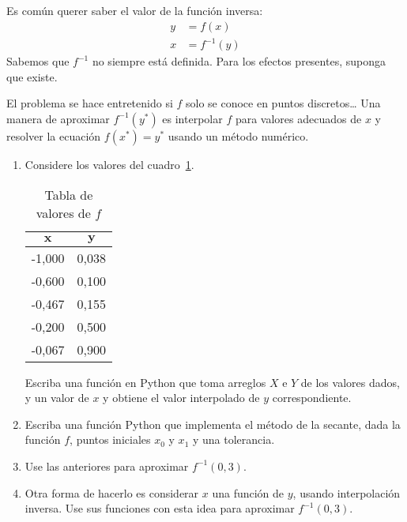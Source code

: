 \documentclass[spanish, fleqn]{article}
\title{Tarea \num\\
       \large Algoritmos y Complejidad\\[3ex]
       \emph{``Tonteando\ldots''}}
\author{Algorithm Knaves}
\date{2018-03-26}
\begin{document}
\maketitle

  Es común querer saber el valor de la función inversa:
  \begin{align*}
    y
      &= f(x) \\
    x
      &= f^{-1}(y)
  \end{align*}
  Sabemos que \(f^{-1}\) no siempre está definida.
  Para los efectos presentes,
  suponga que existe.

  El problema se hace entretenido si \(f\)
  solo se conoce en puntos discretos\ldots
  Una manera de aproximar \(f^{-1}(y^*)\)
  es interpolar \(f\) para valores adecuados de \(x\)
  y resolver la ecuación \(f(x^*) = y^*\)
  usando un método numérico.
  \begin{enumerate}
  \item %
    Considere los valores del cuadro~\ref{tab:20181t1p1t1}.
    \begin{table}[ht]
      \centering
      \begin{tabular}{rr}
        \multicolumn{1}{c}{\(\mathbf{x}\)} &
           \multicolumn{1}{c}{\(\mathbf{y}\)} \\
        \hline
        -1,000 & 0,038 \\
        -0,600 & 0,100 \\
        -0,467 & 0,155 \\
        -0,200 & 0,500 \\
        -0,067 & 0,900
      \end{tabular}
      \caption{Tabla de valores de \(f\)}
      \label{tab:20181t1p1t1}
    \end{table}
    Escriba una función en Python
    que toma arreglos \(X\) e \(Y\) de los valores dados,
    y un valor de \(x\)
    y obtiene el valor interpolado de \(y\) correspondiente.
  \item %
    Escriba una función Python
    que implementa el método de la secante,
    dada la función \(f\), puntos iniciales \(x_0\) y \(x_1\)
    y una tolerancia.
  \item %
    Use las anteriores para aproximar \(f^{-1}(0,3)\).
  \item %
    Otra forma de hacerlo es considerar \(x\) una función de \(y\),
    usando interpolación inversa.
    Use sus funciones con esta idea para aproximar \(f^{-1}(0,3)\).
  \end{enumerate}


\end{document}
